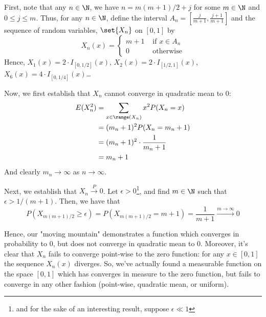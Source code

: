\documentclass[12pt]{article}
\begin{document}
First, note that any $n \in \N$, we have $n = m(m+1)/2 + j$ for some $m \in \N$ and $0 \leq j \leq m$. Thus, for any $n \in \N$, define the interval $A_n = \left[\frac{j}{m+1}, \frac{j+1}{m+1}\right]$ and the sequence of random variables, $\set{X_n}$ on $[0,1]$ by 
\[
X_n(x) = 
\begin{cases}
m+1 &\text{ if $x \in A_n$} \\
0 &\text{ otherwise}
\end{cases}
\]
Hence, $X_1(x) = 2 \cdot I_{[0,1/2]}(x)$, $X_2(x) = 2 \cdot I_{[1/2,1]}(x)$, $X_{6}(x) = 4\cdot I_{[0,1/4]}(x)$\ldots

Now, we first establish that  $X_n$ cannot converge in quadratic mean to 0:
\begin{align*}
E(X_n^2) &= \sum_{x \in \range(X_n)} x^2 P(X_n=x) \\
&= (m_n+1)^2 P(X_n = m_n+1) \\
&= (m_n+1)^2 \cdot \frac{1}{m_n+1} \\
&= m_n+1
\end{align*}
And clearly $m_n \to \infty$ as $n \to \infty$.

Next, we establish that $X_n \xrightarrow{P} 0$. Let $\epsilon > 0$\footnote{and for the sake of an interesting result, suppose $\epsilon \ll 1$}, and find $m \in \N$ such that $\epsilon > 1/(m+1)$. Then, we have that 
\[
P(X_{m(m+1)/2} \geq \epsilon ) = P(X_{m(m+1)/2} = m+1) = \frac{1}{m+1} \xrightarrow{m\to\infty} 0
\]

Hence, our "moving mountain" demonstrates a function which converges in probability to 0, but does not converge in quadratic mean to 0. Moreover, it's clear that $X_n$ fails to converge point-wise to the zero function: for any $x \in [0,1]$ the sequence $X_n(x)$ diverges. So, we've actually found a measurable function on the space $[0,1]$ which has converges in measure to the zero function, but fails to converge in any other fashion (point-wise, quadratic mean, or uniform). 
\end{document}
